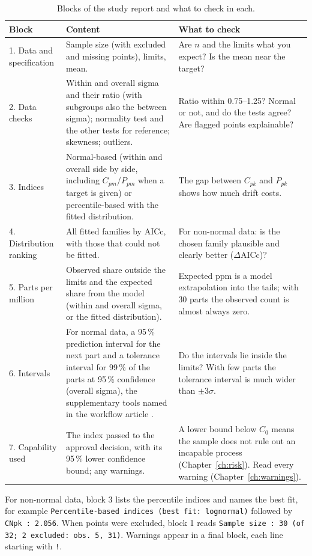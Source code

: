 \documentclass[a4paper,11pt,oneside,openany,parskip=half-,headings=standardclasses,toc=flat,numbers=noenddot]{scrbook}
\newcommand{\thead}[1]{{\sffamily\bfseries\footnotesize #1}}
\newcommand{\code}[1]{\texttt{\begingroup\def\_{\textunderscore\allowbreak}#1\endgroup}}
\newcommand{\chapref}[1]{Chapter~\ref{#1}}
\begin{document}
\begin{table}[!htp]
\caption{Blocks of the study report and what to check in each.}\label{tab:reportblocks}
\small
\begin{tabularx}{\textwidth}{@{}P{29mm}P{62mm}L@{}}
\toprule
\thead{Block} & \thead{Content} & \thead{What to check}\\
. Data and specification & Sample size (with excluded and missing points), limits, mean. & Are $n$ and the limits what you expect? Is the mean near the target?\\
2. Data checks & Within and overall sigma and their ratio (with subgroups also the between sigma); normality test and the other tests for reference; skewness; outliers. & Ratio within 0.75--1.25? Normal or not, and do the tests agree? Are flagged points explainable?\\
3. Indices & Normal-based (within and overall side by side, including $C_{pm}$/$P_{pm}$ when a target is given) or percentile-based with the fitted distribution. & The gap between $C_{pk}$ and $P_{pk}$ shows how much drift costs.\\
4. Distribution ranking & All fitted families by AICc, with those that could not be fitted. & For non-normal data: is the chosen family plausible and clearly better ($\Delta$AICc)?\\
5. Parts per million & Observed share outside the limits and the expected share from the model (within and overall sigma, or the fitted distribution). & Expected ppm is a model extrapolation into the tails; with 30 parts the observed count is almost always zero.\\
6. Intervals & For normal data, a 95\,\% prediction interval for the next part and a tolerance interval for 99\,\% of the parts at 95\,\% confidence (overall sigma), the supplementary tools named in the workflow article \cite[Sec.~7]{jy-workflow}. & Do the intervals lie inside the limits? With few parts the tolerance interval is much wider than $\pm 3\sigma$.\\
7. Capability used & The index passed to the approval decision, with its 95\,\% lower confidence bound; any warnings. & A lower bound below $C_0$ means the sample does not rule out an incapable process (\chapref{ch:risk}). Read every warning (\chapref{ch:warnings}).\\
\bottomrule
\end{tabularx}
\end{table}

For non-normal data, block 3 lists the percentile indices and names the best fit, for example
\code{Percentile-based indices (best fit: lognormal)} followed by \code{CNpk : 2.056}. When points were excluded,
block 1 reads \code{Sample size : 30 (of 32; 2 excluded: obs. 5, 31)}. Warnings appear in a final block,
each line starting with \code{!}.
\end{document}
